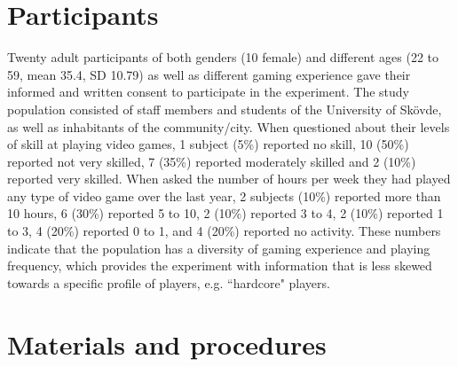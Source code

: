 

\section{Participants}

Twenty adult participants of both genders (10 female) and different ages (22 to 59, mean 35.4, SD 10.79) as well as different gaming experience gave their informed and written consent to participate in the experiment. The study population consisted of staff members and students of the University of Sk\"ovde, as well as inhabitants of the community/city. When questioned about their levels of skill at playing video games, 1 subject (5\%) reported no skill, 10 (50\%) reported not very skilled, 7 (35\%) reported moderately skilled and 2 (10\%) reported very skilled. When asked the number of hours per week they had played any type of video game over the last year, 2 subjects (10\%) reported more than 10 hours, 6 (30\%) reported 5 to 10, 2 (10\%) reported 3 to 4, 2 (10\%) reported 1 to 3, 4 (20\%) reported 0 to 1, and 4 (20\%) reported no activity. These numbers indicate that the population has a diversity of gaming experience and playing frequency, which provides the experiment with information that is less skewed towards a specific profile of players, e.g. ``hardcore" players.

\section{Materials and procedures}

